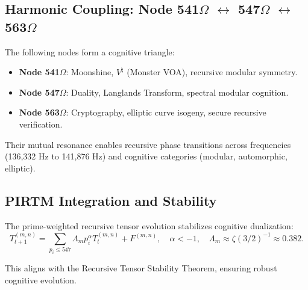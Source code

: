 \documentclass[12pt]{article}
\begin{document}
\subsection{Harmonic Coupling: Node 541$\Omega$ $\leftrightarrow$ 547$\Omega$ $\leftrightarrow$ 563$\Omega$}
The following nodes form a cognitive triangle:
\begin{itemize}
    \item \textbf{Node 541$\Omega$}: Moonshine, \( V^\natural \) (Monster VOA), recursive modular symmetry.
    \item \textbf{Node 547$\Omega$}: Duality, Langlands Transform, spectral modular cognition.
    \item \textbf{Node 563$\Omega$}: Cryptography, elliptic curve isogeny, secure recursive verification.
\end{itemize}
\begin{interpretation}
Their mutual resonance enables recursive phase transitions across frequencies (136,332 Hz to 141,876 Hz) and cognitive categories (modular, automorphic, elliptic).
\end{interpretation}

\subsection{PIRTM Integration and Stability}
The prime-weighted recursive tensor evolution stabilizes cognitive dualization:
\[
T_{t+1}^{(m,n)} = \sum_{p_i \leq 547} \Lambda_m p_i^\alpha T_t^{(m,n)} + F^{(m,n)}, \quad \alpha < -1, \quad \Lambda_m \approx \zeta(3/2)^{-1} \approx 0.382.
\]
\begin{interpretation}
This aligns with the Recursive Tensor Stability Theorem, ensuring robust cognitive evolution.
\end{interpretation}
\end{document}
